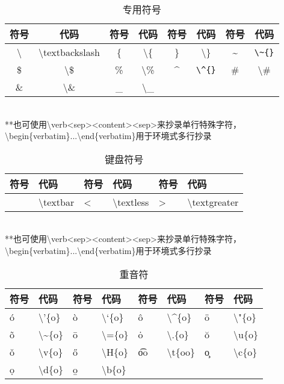 \documentclass[UTF8,fontset=ubuntu]{ctexbook}
\begin{document}
\begin{table}[H]
\begin{tabular}{c c c c c c c c}
	\hline
	符号 & 代码 & 符号 & 代码 & 符号 & 代码 & 符号 & 代码\\
	\hline
	\textbackslash & \textbackslash textbackslash & \{ & \textbackslash\{ & \} & \textbackslash\} & \~{} & \verb|\~{}|\\
	\$ & \textbackslash\$ & \% & \textbackslash\% & \^{} & \verb|\^{}| & \# & \textbackslash\#\\
	\& & \textbackslash\& & \_ & \textbackslash\_\\
	\hline
\end{tabular}\\[2mm]
\RaggedRight
**也可使用\textbackslash verb\textless sep\textgreater\textless content\textgreater\textless sep\textgreater 来抄录单行特殊字符，\textbackslash begin\{verbatim\}...\textbackslash end\{verbatim\}用于环境式多行抄录\\
\caption{专用符号}
\end{table}

\begin{table}[H]
\begin{tabular}{l l l l l l}
	\hline
	符号 & 代码 & 符号 & 代码 & 符号 & 代码\\
	\hline
	\textbar & \textbackslash textbar & \textless & \textbackslash textless & \textgreater & \textbackslash textgreater\\
	\hline
\end{tabular}\\[2mm]
\RaggedRight
**也可使用\textbackslash verb\textless sep\textgreater\textless content\textgreater\textless sep\textgreater 来抄录单行特殊字符，\textbackslash begin\{verbatim\}...\textbackslash end\{verbatim\}用于环境式多行抄录\\
\caption{键盘符号}
\end{table}

\begin{table}[H]
\begin{tabular}{l l l l l l l l}
	\hline
	符号 & 代码 & 符号 & 代码 & 符号 & 代码 & 符号 & 代码\\
	\hline
	\'{o} & \textbackslash'\{o\} & \`{o} & \textbackslash`\{o\} & \^{o} & \textbackslash\^{}\{o\} & \"{o} & \textbackslash"\{o\}\\
	\~{o} & \textbackslash\~{}\{o\} & \={o} & \textbackslash=\{o\} & \.{o} & \textbackslash.\{o\} & \u{o} & \textbackslash u\{o\}\\
	\v{o} & \textbackslash v\{o\} & \H{o} & \textbackslash H\{o\} & \t{oo} & \textbackslash t\{oo\} & \c{o} & \textbackslash c\{o\}\\
	\d{o} & \textbackslash d\{o\} & \b{o} & \textbackslash b\{o\}\\
	\hline
\end{tabular}
\caption{重音符}
\end{table}
\end{document}
